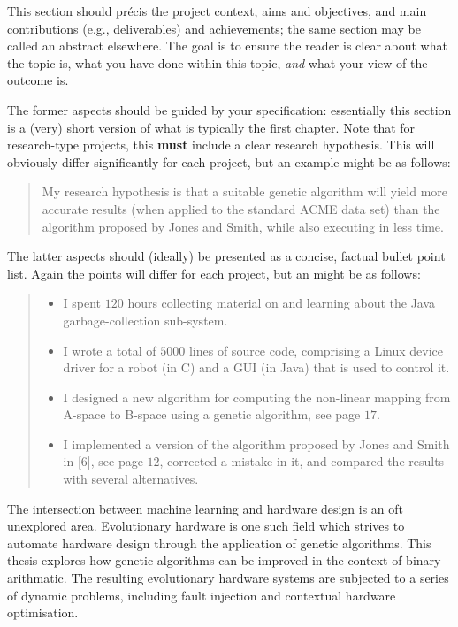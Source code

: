 \noindent
{
	\color{red}
This section should pr\'{e}cis the project context, aims and objectives,
and main contributions (e.g., deliverables) and achievements; the same
section may be called an abstract elsewhere.  The goal is to ensure the
reader is clear about what the topic is, what you have done within this
topic, {\em and} what your view of the outcome is.

The former aspects should be guided by your specification: essentially
this section is a (very) short version of what is typically the first
chapter.  Note that for research-type projects, this {\bf must} include
a clear research hypothesis.  This will obviously differ significantly
for each project, but an example might be as follows:

\begin{quote}
My research hypothesis is that a suitable genetic algorithm will yield
more accurate results (when applied to the standard ACME data set) than
the algorithm proposed by Jones and Smith, while also executing in less
time.
\end{quote}

\noindent
The latter aspects should (ideally) be presented as a concise, factual
bullet point list.  Again the points will differ for each project, but
an might be as follows:

\begin{quote}
\noindent
\begin{itemize}
\item I spent $120$ hours collecting material on and learning about the
      Java garbage-collection sub-system.
\item I wrote a total of $5000$ lines of source code, comprising a Linux
      device driver for a robot (in C) and a GUI (in Java) that is
      used to control it.
\item I designed a new algorithm for computing the non-linear mapping
      from A-space to B-space using a genetic algorithm, see page $17$.
\item I implemented a version of the algorithm proposed by Jones and
      Smith in [6], see page $12$, corrected a mistake in it, and
      compared the results with several alternatives.
\end{itemize}
\end{quote}
}


The intersection between machine learning and hardware design is an oft
unexplored area. Evolutionary hardware is one such field which strives
to automate hardware design through the application of genetic algorithms.
This thesis
explores how genetic algorithms can be improved in the context
of binary arithmatic.
The resulting evolutionary hardware systems are subjected to a series of
dynamic problems, including fault injection and contextual hardware optimisation.

